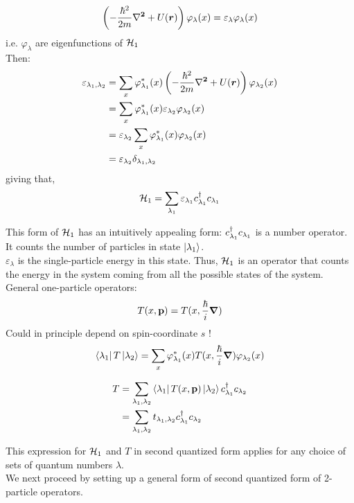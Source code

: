 \begin{equation}
	\left(-\frac{\hbar^2}{2m} \vb{\laplacian}+ U(\vr)  \right) \varphi_\lambda(x) = \varepsilon_\lambda \varphi_\lambda(x)
\end{equation}
i.e. ${\varphi_\lambda}$ are eigenfunctions of $\mathcal{H}_1$\\
\linebreak
\noindent Then:
\begin{align}
	\varepsilon_{\lambda_1, \lambda_2} &= \sum_x \varphi_{\lambda_1}^*(x)  \left(-\frac{\hbar^2}{2m} \vb{\laplacian}+ U(\vr)  \right) \varphi_{\lambda_2} (x)\\
	&=  \sum_x \varphi_{\lambda_1}^*(x) \varepsilon_{\lambda_2} \varphi_{\lambda_2}(x) \nonumber \\
	&= \varepsilon_{\lambda_2} \sum_x \varphi_{\lambda_1}^*(x) \varphi_{\lambda_2}(x)\nonumber \\
	&= \varepsilon_{\lambda_2} \delta_{\lambda_1, \lambda_2} \nonumber
\end{align}
giving that, 
\begin{equation}
	\mathcal{H}_1 = \sum_{\lambda_1} \varepsilon_{\lambda_1} c^{\dagger}_{\lambda_1} c_{\lambda_1}
\end{equation}

\noindent This form of $\mathcal{H}_1$ has an intuitively appealing form: $  c^{\dagger}_{\lambda_1} c_{\lambda_1}$ is a number operator. It counts the number of particles in state $\ket{\lambda_1}$.\\
\noindent $\varepsilon_\lambda$ is the single-particle energy in this state. Thus, $\mathcal{H}_1$ is an operator that counts the energy in the system coming from all the possible states of the system.\\
\linebreak
\noindent General one-particle operators:
\begin{equation}
	T(x, \vb{p}) = T(x, \frac{\hbar}{i} \vb{\gradient}) 
\end{equation}
Could in principle depend on spin-coordinate $s$ !
\begin{equation}
	\bra{\lambda_1} T \ket{\lambda_2} = \sum_x \varphi_{\lambda_1}^*(x) T(x, \frac{\hbar}{i} \vb{\gradient}) \varphi_{\lambda_2}(x)
\end{equation}

\begin{tcolorbox}
	\begin{align}
		T &= \sum_{\lambda_1,\lambda_2} \bra{\lambda_1} T(x, \vb{p}) \ket{\lambda_2} c^{\dagger}_{\lambda_1} c_{\lambda_2}\\
		&=\sum_{\lambda_1,\lambda_2} t_{\lambda_1,\lambda_2} c^{\dagger}_{\lambda_1} c_{\lambda_2} \nonumber
	\end{align}
\end{tcolorbox}
\noindent This expression for $\mathcal{H}_1$ and $T$ in second quantized form applies for any choice of sets of quantum numbers $\lambda$.\\
\linebreak
\noindent We next proceed by setting up a general form of second quantized form of 2-particle operators.


